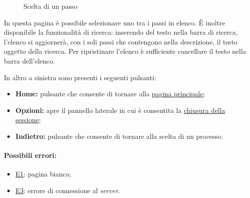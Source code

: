 \begin{figure}[H] \centering 
{} \caption{Scelta di un passo}
\label{fig:Fprocess}
\end{figure}

In questa pagina è possibile selezionare uno tra i passi in elenco. È inoltre disponibile la funzionalità di ricerca: inserendo del testo nella barra di ricerca, l'elenco si aggiornerà, con i soli passi che contengono nella descrizione, il testo oggetto della ricerca.
Per ripristinare l'elenco è sufficiente cancellare il testo nella barra dell'elenco.

In altro a sinistra sono presenti i seguenti pulsanti:
\begin{itemize}
\item \textbf{Home:} pulsante che consente di tornare alla \hyperref[home]{pagina principale};
\item \textbf{Opzioni:} apre il pannello laterale in cui è consentita la \hyperref[logout]{chiusura della sessione};
\item \textbf{Indietro:} pulsante che consente di tornare alla scelta di un processo.
\end{itemize}

\paragraph*{Possibili errori:}
\begin{itemize}
\item \hyperref[e1]{E1}: pagina bianca;
\item \hyperref[e3]{E3}: errore di connessione al \textit{server}.
\end{itemize}

